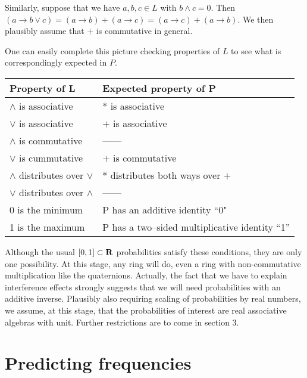 \documentclass[12pt]{article}
\begin{document}
   Similarly, suppose that we have $a,b,c\in L$ with $b\wedge c=0$.  Then
$(a\rightarrow b\vee c)=(a\rightarrow b)+(a\rightarrow c)=(a\rightarrow c)+(a\rightarrow b)$.
We then plausibly assume that $+$ is commutative in general.

    One can easily complete this picture checking properties of $L$ to see what
is correspondingly expected in $P$.

\begin{center}
    \begin{tabular}{|l|l|}
         Property of L & Expected property of P \\ \hline
         $\wedge$ is associative    & $*$ is associative \\ 
         $\vee$ is associative  & $+$ is associative \\
		 $\wedge$ is commutative & ------ \\
		 $\vee$ is cummutative & $+$ is commutative \\
		 $\wedge$ distributes over $\vee$ & $*$ distributes both ways over $+$ \\
		 $\vee$ distributes over $\wedge$ & ------ \\
		 0 is the minimum & P has an additive identity ``0" \\
		 1 is the maximum & P has a two--sided multiplicative identity ``1'' \\ \hline
    \end  {tabular}
\end  {center}

\noindent Although the usual $[0,1]\subset {\bf R}$ probabilities 
satisfy these conditions, they are only one possibility.  
At this stage, any ring will do, even a ring with non-commutative multiplication like the
quaternions. Actually, the fact that we have to explain interference effects
strongly suggests that we will need probabilities with an additive inverse.  
Plausibly also requiring scaling of probabilities by real numbers, we assume, at
this stage, that the probabilities of interest are real associative algebras
with unit.  Further restrictions are to come in section 3.

\section{Predicting frequencies}
\end{document}
